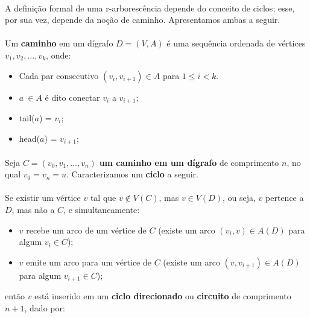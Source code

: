\documentclass[12pt,a4paper]{article}
\begin{document}
\paragraph{}
A definição formal de uma r-arborescência depende do conceito de ciclos; esse, por sua vez, depende da noção de caminho. Apresentamos ambas a seguir.

\paragraph{}
Um \textbf{caminho} em um dígrafo \(D = (V, A)\) é uma sequência ordenada de vértices \(v_1, v_2, \ldots, v_k\), onde:

\begin{itemize}
\item Cada par consecutivo \((v_i, v_{i+1}) \in A\) para \(1 \leq i < k\). 
\item \(a\ \in A\) é dito conectar \(v_i\) a \(v_{i+1}\);
\item tail(\(a\)) = \(v_i\);
\item head(\(a\)) = \(v_{i+1}\);
\end{itemize}

\paragraph{}
Seja \( C = (v_0, v_1, \ldots, v_n) \) \textbf{um caminho em um dígrafo} de comprimento \( n \), no qual \( v_0 = v_n = u \). Caracterizamos um \textbf{ciclo} a seguir. 

\paragraph{}
Se existir um vértice \( v \) tal que \( v \notin V(C) \), mas \( v \in V(D) \), ou seja, \( v \) pertence a \( D \), mas não a \( C \), e simultaneamente:

\begin{itemize}
    \item \( v \) recebe um arco de um vértice de \( C \) (existe um arco \( (v_i, v) \in A(D) \) para algum \( v_i \in C \));
    \item \( v \) emite um arco para um vértice de \( C \) (existe um arco \( (v, v_{i+1}) \in A(D) \) para algum \( v_{i+1} \in C \));
\end{itemize}

então \( v \) está inserido em um \textbf{ciclo direcionado} ou \textbf{circuito} de comprimento \( n+1 \), dado por:
\end{document}
